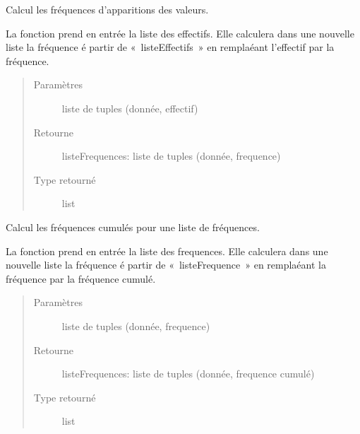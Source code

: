 \documentclass[letterpaper,10pt,french]{sphinxmanual}
\begin{document}

\begin{fulllineitems}
\label{\detokenize{addQualitatives:add.addQualitatives.calculFrequences}}
Calcul les fréquences d’apparitions des valeurs.

La fonction prend en entrée la liste des effectifs. Elle calculera dans une nouvelle liste la fréquence é partir 
de « listeEffectifs » en remplaéant l’effectif par la fréquence.
\begin{quote}\begin{description}
\item[{Paramètres}] \leavevmode
{} \textendash{} liste de tuples (donnée, effectif)

\item[{Retourne}] \leavevmode
listeFrequences: liste de tuples (donnée, frequence)

\item[{Type retourné}] \leavevmode
list

\end{description}\end{quote}

\end{fulllineitems}


\begin{fulllineitems}
\label{\detokenize{addQualitatives:add.addQualitatives.calculFrequencesCumulees}}
Calcul les fréquences cumulés pour une liste de fréquences.

La fonction prend en entrée la liste des frequences. Elle calculera dans une nouvelle liste la fréquence é partir 
de « listeFrequence » en remplaéant la fréquence par la fréquence cumulé.
\begin{quote}\begin{description}
\item[{Paramètres}] \leavevmode
{} \textendash{} liste de tuples (donnée, frequence)

\item[{Retourne}] \leavevmode
listeFrequences: liste de tuples (donnée, frequence cumulé)

\item[{Type retourné}] \leavevmode
list

\end{description}\end{quote}

\end{fulllineitems}
\end{document}
